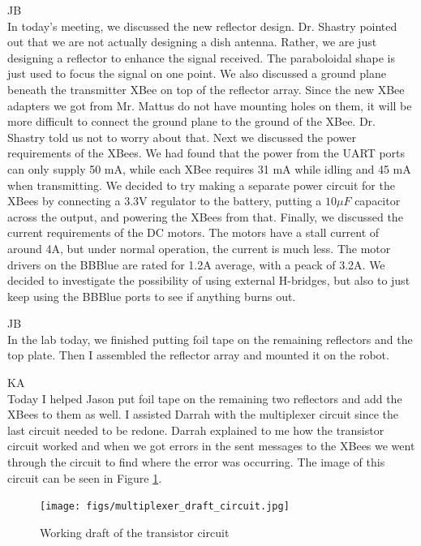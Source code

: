 \documentclass[fontsize=11pt, %
                             paper=letter, %
                             openany, %
                             captions=tableheading,
                             index=totoc,
                             hyperref]{labbook}
\begin{document}
\begin{addmargin}[0cm]{0cm}
JB\\
In today's meeting, we discussed the new reflector design. Dr. Shastry pointed out that we are not actually designing a dish antenna. Rather, we are just designing a reflector to enhance the signal received. The paraboloidal shape is just used to focus the signal on one point. We also discussed a ground plane beneath the transmitter XBee on top of the reflector array. Since the new XBee adapters we got from Mr. Mattus do not have mounting holes on them, it will be more difficult to connect the ground plane to the ground of the XBee. Dr. Shastry told us not to worry about that. Next we discussed the power requirements of the XBees. We had found that the power from the UART ports can only supply 50 mA, while each XBee requires 31 mA while idling and 45 mA when transmitting. We decided to try making a separate power circuit for the XBees by connecting a 3.3V regulator to the battery, putting a $10\mu F$ capacitor across the output, and powering the XBees from that. Finally, we discussed the current requirements of the DC motors. The motors have a stall current of around 4A, but under normal operation, the current is much less. The motor drivers on the BBBlue are rated for 1.2A average, with a peack of 3.2A. We decided to investigate the possibility of using external H-bridges, but also to just keep using the BBBlue ports to see if anything burns out.

JB\\
In the lab today, we finished putting foil tape on the remaining reflectors and the top plate. Then I assembled the reflector array and mounted it on the robot.

\vspace*{12pt}
KA\\
Today I helped Jason put foil tape on the remaining two reflectors and add the XBees to them as well. I assisted Darrah with the multiplexer circuit since the last circuit needed to be redone. Darrah explained to me how the transistor circuit worked and when we got errors in the sent messages to the XBees we went through the circuit to find where the error was occurring. The image of this circuit can be seen in Figure \ref{fig:transistor_circuit}.

\begin{figure}
    \center
    \texttt{[image: figs/multiplexer\_draft\_circuit.jpg]}
    \caption{Working draft of the transistor circuit}
    \label{fig:transistor_circuit}
\end{figure}


\end{addmargin}
\end{document}
